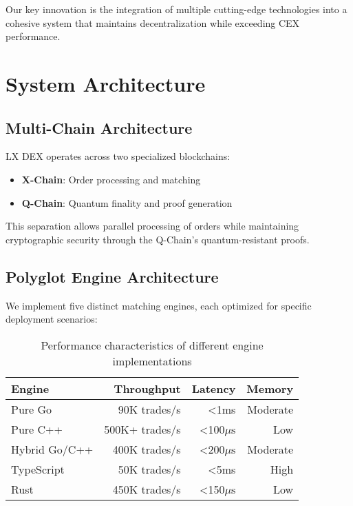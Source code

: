 \documentclass[11pt,a4paper]{article}
\newcommand{\lxdex}{\textsc{LX DEX}}
\newcommand{\microsec}{\mu\text{s}}
\begin{document}
Our key innovation is the integration of multiple cutting-edge technologies into a cohesive system that maintains decentralization while exceeding CEX performance.

\section{System Architecture}

\subsection{Multi-Chain Architecture}

\lxdex{} operates across two specialized blockchains:

\begin{itemize}
    \item \textbf{X-Chain}: Order processing and matching
    \item \textbf{Q-Chain}: Quantum finality and proof generation
\end{itemize}

This separation allows parallel processing of orders while maintaining cryptographic security through the Q-Chain's quantum-resistant proofs.

\subsection{Polyglot Engine Architecture}

We implement five distinct matching engines, each optimized for specific deployment scenarios:

\begin{table}[H]
\centering
\begin{tabular}{lrrr}
\toprule
\textbf{Engine} & \textbf{Throughput} & \textbf{Latency} & \textbf{Memory} \\
\midrule
Pure Go & 90K trades/s & <1ms & Moderate \\
Pure C++ & 500K+ trades/s & <100$\microsec$ & Low \\
Hybrid Go/C++ & 400K trades/s & <200$\microsec$ & Moderate \\
TypeScript & 50K trades/s & <5ms & High \\
Rust & 450K trades/s & <150$\microsec$ & Low \\
\bottomrule
\end{tabular}
\caption{Performance characteristics of different engine implementations}
\label{tab:engines}
\end{table}
\end{document}

